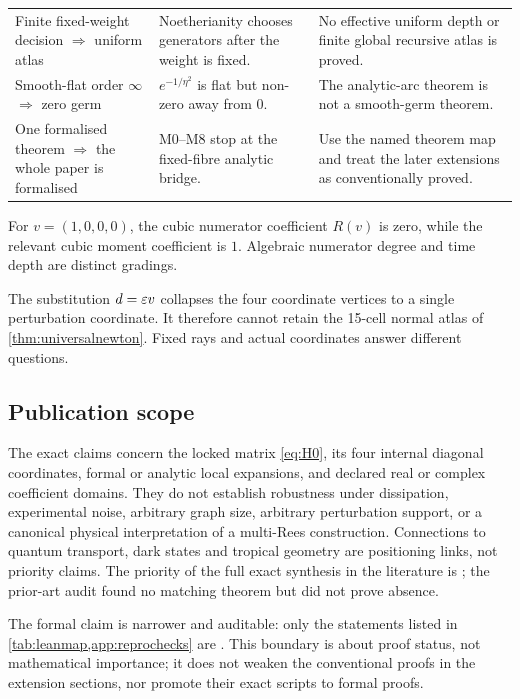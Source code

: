 \begin{longtable}{p{}p{}p{}}
Finite fixed-weight decision \(\Rightarrow\) uniform atlas & Noetherianity
chooses generators after the weight is fixed. & No effective uniform depth or
finite global recursive atlas is proved.\\
Smooth-flat order \(\infty\) \(\Rightarrow\) zero germ &
\(e^{-1/\eta^2}\) is flat but non-zero away from \(0\). & The analytic-arc
theorem is not a smooth-germ theorem.\\
One formalised theorem \(\Rightarrow\) the whole paper is formalised & M0--M8
stop at the fixed-fibre analytic bridge. & Use the named theorem map and treat
the later extensions as conventionally proved.\\
\bottomrule
\end{longtable}

\begin{counterexample}
For \(v=(1,0,0,0)\), the cubic numerator coefficient \(R(v)\) is zero, while
the relevant cubic moment coefficient is \(1\).  Algebraic numerator degree and
time depth are distinct gradings.
\end{counterexample}

\begin{counterexample}
The substitution \(d=\varepsilon v\) collapses the four coordinate vertices to a single
perturbation coordinate.  It therefore cannot retain the 15-cell normal atlas
of \cref{thm:universalnewton}.  Fixed rays and actual coordinates answer
different questions.
\end{counterexample}

\subsection{Publication scope}

The exact claims concern the locked matrix \cref{eq:H0}, its four internal
diagonal coordinates, formal or analytic local expansions, and declared real
or complex coefficient domains.  They do not establish robustness under
dissipation, experimental noise, arbitrary graph size, arbitrary perturbation
support, or a canonical physical interpretation of a multi-Rees construction.
Connections to quantum transport, dark states and tropical geometry are
positioning links, not priority claims.  The priority of the full exact
synthesis in the literature is ; the prior-art audit found
no matching theorem but did not prove absence.

The formal claim is narrower and auditable: only the statements listed in
\cref{tab:leanmap,app:reprochecks} are .  This boundary
is about proof status, not mathematical importance; it does not weaken the
conventional proofs in the extension sections, nor promote their exact scripts
to formal proofs.
